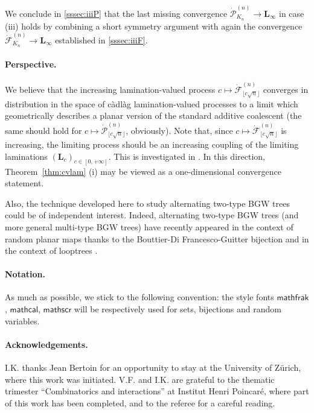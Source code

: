 \documentclass[AHL,XML,longabstracts,Unicode]{cedram}
\def\PPP{\mathcal P}
\def\FFF{\mathcal F}
\def\dFKn{\dot{\mathcal{F}}^{(n)}_{K_{n}}}
\def\dPKn{\dot{\mathcal{P}}^{(n)}_{K_{n}}}
\begin{document}
We conclude in \cref{sssec:iiiP} that   the last missing convergence $\dPKn \rightarrow \mathbf{L}_{\infty}$ in case (iii) holds by combining a short symmetry argument with again the convergence $ \dFKn \rightarrow \mathbf{L}_{\infty}$  established in \cref{sssec:iiiF}.


\paragraph*{Perspective.} We believe that the increasing lamination-valued process $ c \mapsto \dot{\FFF}^{(n)}_{\lfloor c\sqrt{n} \rfloor}$ converges in distribution in the space of c\`adl\`ag lamination-valued processes to a limit which geometrically describes a planar version of the standard additive coalescent \cite{AP98} (the same should hold for $ c \mapsto \dot{\PPP}^{(n)}_{\lfloor c\sqrt{n} \rfloor}$,
obviously).
Note that, since $ c \mapsto \dot{\FFF}^{(n)}_{\lfloor c\sqrt{n} \rfloor}$ is increasing,
the limiting process should be an increasing coupling of the limiting laminations $(\mathbf L_c)_{c \in [0,+\infty]}$.
This is investigated in \cite{Thev18}.
In this direction, Theorem~\ref{thm:cvlam} (i) may be viewed as a one-dimensional convergence statement.

Also, the technique developed here to study alternating two-type BGW trees could be of independent interest.
Indeed, alternating two-type BGW trees (and more general multi-type BGW trees) have recently appeared in the context of random planar maps thanks to the Bouttier-Di Francesco-Guitter bijection \cite{BDFG04,MM07,LGM09} and in the context of looptrees \cite{CK15}.

\paragraph*{Notation.} As much as possible, we stick to the following convention: the style fonts $\mathsf{mathfrak}$, $\mathsf{mathcal}$, $\mathsf{mathscr}$ will be respectively used for sets, bijections and random variables.

\paragraph*{Acknowledgements.} I.K. thanks Jean Bertoin for an opportunity to stay at the University of Z\"urich, where this work was initiated. V.F. and I.K. are grateful to the thematic trimester ``Combinatorics and interactions'' at Institut Henri Poincar\'e, where part of this work has been completed, and to the referee for a careful reading.
\end{document}
